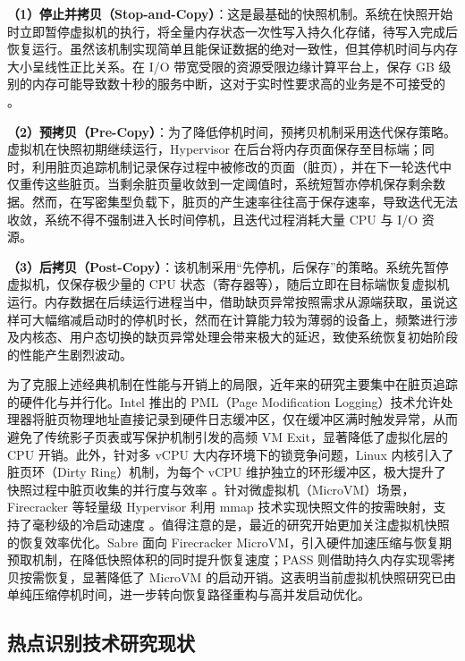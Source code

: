 \textbf{（1）停止并拷贝（Stop-and-Copy）}：这是最基础的快照机制。系统在快照开始时立即暂停虚拟机的执行，将全量内存状态一次性写入持久化存储\cite{dunlap2002revirt}，待写入完成后恢复运行。虽然该机制实现简单且能保证数据的绝对一致性，但其停机时间与内存大小呈线性正比关系。在 I/O 带宽受限的资源受限边缘计算平台上，保存 GB 级别的内存可能导致数十秒的服务中断，这对于实时性要求高的业务是不可接受的 。

\textbf{（2）预拷贝（Pre-Copy）}：为了降低停机时间，预拷贝机制采用迭代保存策略\cite{clark2005live}。虚拟机在快照初期继续运行，Hypervisor 在后台将内存页面保存至目标端；同时，利用脏页追踪机制记录保存过程中被修改的页面（脏页），并在下一轮迭代中仅重传这些脏页。当剩余脏页量收敛到一定阈值时，系统短暂亦停机保存剩余数据。然而，在写密集型负载下，脏页的产生速率往往高于保存速率，导致迭代无法收敛\cite{akiyama2013fast}，系统不得不强制进入长时间停机，且迭代过程消耗大量 CPU 与 I/O 资源。

\textbf{（3）后拷贝（Post-Copy）}：该机制采用“先停机，后保存”的策略\cite{hines2009post}。系统先暂停虚拟机，仅保存极少量的 CPU 状态（寄存器等），随后立即在目标端恢复虚拟机运行。内存数据在后续运行进程当中，借助缺页异常按照需求从源端获取，虽说这样可大幅缩减启动时的停机时长，然而在计算能力较为薄弱的设备上，频繁进行涉及内核态、用户态切换的缺页异常处理会带来极大的延迟，致使系统恢复初始阶段的性能产生剧烈波动。

为了克服上述经典机制在性能与开销上的局限，近年来的研究主要集中在脏页追踪的硬件化与并行化。Intel 推出的 PML（Page Modification Logging）技术允许处理器将脏页物理地址直接记录到硬件日志缓冲区，仅在缓冲区满时触发异常，从而避免了传统影子页表或写保护机制引发的高频 VM Exit，显著降低了虚拟化层的 CPU 开销\cite{wang2014vm, intel_pml_arxiv}。此外，针对多 vCPU 大内存环境下的锁竞争问题，Linux 内核引入了脏页环（Dirty Ring）机制，为每个 vCPU 维护独立的环形缓冲区，极大提升了快照过程中脏页收集的并行度与效率 。针对微虚拟机（MicroVM）场景，Firecracker 等轻量级 Hypervisor 利用 mmap 技术实现快照文件的按需映射，支持了毫秒级的冷启动速度 。值得注意的是，最近的研究开始更加关注虚拟机快照的恢复效率优化。Sabre 面向 Firecracker MicroVM，引入硬件加速压缩与恢复期预取机制，在降低快照体积的同时提升恢复速度\cite{sabre2024}；PASS 则借助持久内存实现零拷贝按需恢复，显著降低了 MicroVM 的启动开销\cite{pass2024}。这表明当前虚拟机快照研究已由单纯压缩停机时间，进一步转向恢复路径重构与高并发启动优化。

\subsection{热点识别技术研究现状}

